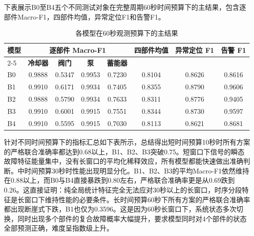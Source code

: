\documentclass[12pt, a4paper]{ctexart}
\begin{document}
下表展示B0至B4五个不同测试对象在完整周期60秒时间预算下的主结果，包含逐部件Macro-F1，四部件均值，异常定位F1和告警F1。
\begin{table}[H]
    \centering
    \caption{各模型在60秒观测预算下的主结果}
    \label{tab:main_results_60s}
    \begin{tabular}{lccccccc}
        \toprule
        \multirow{2}{*}{\textbf{模型}} & \multicolumn{4}{c}{\textbf{逐部件 Macro-F1}} & \multirow{2}{*}{\textbf{四部件均值}} & \multirow{2}{*}{\textbf{异常定位 F1}} & \multirow{2}{*}{\textbf{告警 F1}} \\
        \cmidrule(lr){2-5}
                       & \textbf{冷却器} & \textbf{阀门} & \textbf{泵} & \textbf{蓄能器} &         &         &         \\
        \midrule
        B0             & 0.9888 & 0.5347 & 0.9953 & 0.7230 & 0.8104 & 0.8626 & 0.8616 \\
        B1             & 0.9910 & 0.6171 & 0.9934 & 0.7405 & 0.8355 & 0.8790 & 0.9606 \\
        B2             & 0.9888 & 0.5790 & 0.9934 & 0.7633 & 0.8311 & 0.8776 & 0.9405 \\
        B3             & 0.9910 & 0.6001 & 0.9915 & 0.7551 & 0.8344 & 0.8730 & 0.9597 \\
        B4             & 0.9910 & 0.5595 & 0.9915 & 0.7030 & 0.8113 & 0.8621 & 0.8681 \\
        \bottomrule
    \end{tabular}
\end{table}
针对不同时间预算下的指标汇总如下表所示，总结得出短时间预算10秒时所有方案的严格联合准确率都达到0.68以上，B1、B2、B3突破0.75。短窗口下信号的瞬态故障特征能量集中，没有长窗口的平均化稀释效应，所有模型都能快速做出准确判断。中时间预算30秒时性能出现明显分化。B1、B2、B3的平均Macro-F1依然维持在0.88以上，而B0与B4直接暴跌到0.80左右，严格联合准确率更是从0.69跌到0.26。这直接证明：‌纯全局统计特征完全无法应对30秒以上的长窗口，时序分段特征是长窗口下维持性能的必要条件‌。长时间预算60秒下所有方案的严格联合准确率都出现断崖式下跌，B1也仅为0.3596。这是因为60秒长窗口下，系统状态多次切换，同时出现多个部件的复合故障概率大幅提升，要求模型同时对4个部件的状态全部预测正确，难度呈指数级上升。
\end{document}
